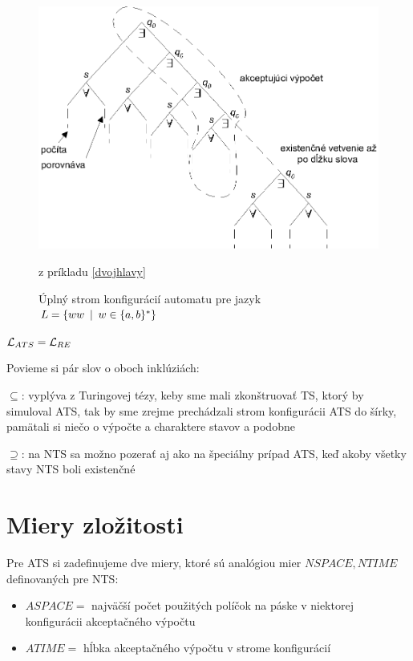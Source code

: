 \begin{figure}[!ht]
  \centering
  \includegraphics{img/apreww}
  \caption{Úplný strom konfigurácií automatu pre jazyk $L=\{ww\enspace |\enspace
  w\in\{a,b\}^*\}$} z príkladu \ref{dvojhlavy} \label{apreww}
\end{figure}

\begin{veta}
  $\mathcal{L}_{ATS} = \mathcal{L}_{RE}$
\end{veta}

\begin{dokaz}
  Povieme si pár slov o oboch inklúziách:
  \begin{description}
    \item{$\subseteq$:} vyplýva z Turingovej tézy, keby sme mali
      zkonštruovať TS, ktorý by simuloval ATS, tak by sme zrejme
      prechádzali strom konfigurácii ATS do šírky, pamätali si niečo o
      výpočte a charaktere stavov a podobne
    \item{$\supseteq$:} na NTS sa možno pozerať aj ako na špeciálny
      prípad ATS, keď akoby všetky stavy NTS boli existenčné
  \end{description}
\end{dokaz}

\section{Miery zložitosti}

Pre ATS si zadefinujeme dve miery, ktoré sú analógiou mier
$NSPACE,NTIME$ definovaných pre NTS:

\begin{itemize}
  \item $ASPACE=$ najväčší počet použitých políčok na páske v
    niektorej konfigurácii akceptačného výpočtu
  \item $ATIME=$ hĺbka akceptačného výpočtu v strome
    konfigurácií
\end{itemize}

